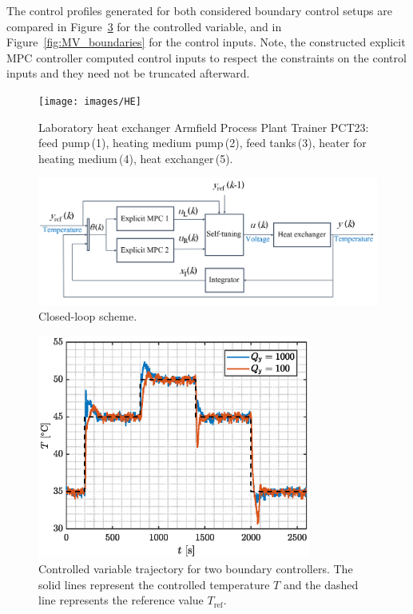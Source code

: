 \documentclass[preprint,12pt]{elsarticle}
\begin{document}
	The control profiles generated for both considered boundary control setups are compared in Figure~\ref{fig:CV_boundaries} for the controlled variable, and in Figure~\ref{fig:MV_boundaries} for the control inputs. 
	Note, the constructed explicit MPC controller computed control inputs to respect the constraints on the control inputs and they need not be truncated afterward.		
	
	\begin{figure}
		\begin{center}
			\texttt{[image: images/HE]}
			\caption[Heat exchanger Armfield Process Plant Trainer PCT23]{Laboratory heat exchanger Armfield Process Plant Trainer PCT23: feed pump\,(1), heating medium pump\,(2), feed tanks\,(3), heater for heating medium\,(4), heat exchanger\,(5).}
			\label{fig:HE}
		\end{center}
	\end{figure}
	
	\begin{figure}
		\begin{center}
			\includegraphics[width=\textwidth]{images/cl}
			\caption[Scheme of the implemented closed-loop control setup.]{Closed-loop scheme.}
			\label{fig:CL}
		\end{center}
	\end{figure}
	
	\begin{figure}
		\begin{center}
			\includegraphics[width=0.8\textwidth]{images/CV_boundaries}
			\caption{Controlled variable trajectory for two boundary controllers. The solid lines represent the controlled temperature $T$ and the dashed line represents the reference value $T_{\mathrm{ref}}$.}
			\label{fig:CV_boundaries}
		\end{center}
	\end{figure}
	
\end{document}
